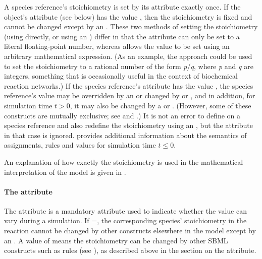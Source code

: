 A species reference's stoichiometry is set by its
 attribute exactly once.  If the
\SpeciesReference object's  attribute (see below)
has the value , then the stoichiometry is fixed and
cannot be changed except by an \InitialAssignment.  These two
methods of setting the stoichiometry (\ie using
 directly, or using an \InitialAssignment)
differ in that the  attribute can only be set
to a literal floating-point number, whereas \InitialAssignment
allows the value to be set using an arbitrary mathematical
expression.  (As an example, the approach could be used to set the
stoichiometry to a rational number of the form \emph{p}/\emph{q},
where \emph{p} and \emph{q} are integers, something that is
occasionally useful in the context of biochemical reaction
networks.)  If the species reference's  attribute
has the value , the species reference's value may be
overridden by an \InitialAssignment or changed by \AssignmentRule
or \AlgebraicRule, and in addition, for simulation time $t > 0$,
it may also be changed by a \RateRule or \Event.  (However,
some of these constructs are mutually exclusive; see
 and .)  It is not an
error to define  on a species reference and
also redefine the stoichiometry using an \InitialAssignment, but
the  attribute in that case is ignored.
 provides additional information about
the semantics of assignments, rules and values for simulation time
$t \leq 0$.

An explanation of how exactly the stoichiometry is used in the
mathematical interpretation of the model is given in
.


\paragraph{The  attribute}

The \SpeciesReference attribute  is a
mandatory  attribute used to indicate whether the
 value can vary during a simulation.  If
=, the corresponding species'
stoichiometry in the reaction cannot be changed by other
constructs elsewhere in the model except by an \InitialAssignment.
A value of  means the stoichiometry can be changed by
other SBML constructs such as rules (see ),
as described above in the section on the 
attribute.


